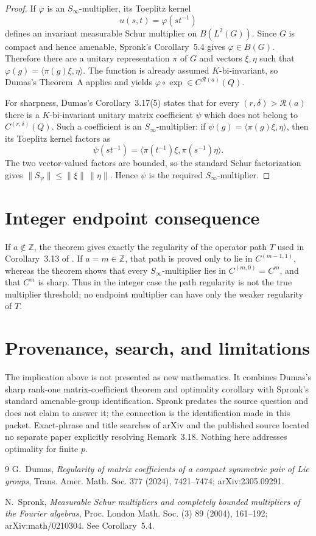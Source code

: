 \documentclass[11pt]{article}
\newcommand{\Z}{\mathbb Z}
\begin{document}
\begin{proof}
If $\varphi$ is an $S_\infty$-multiplier, its Toeplitz kernel
\[
 u(s,t)=\varphi(st^{-1})
\]
defines an invariant measurable Schur multiplier on $B(L^2(G))$.  Since $G$
is compact and hence amenable, Spronk's Corollary~5.4 gives
$\varphi\in B(G)$.  Therefore there are a unitary representation $\pi$ of
$G$ and vectors $\xi,\eta$ such that
$\varphi(g)=\langle\pi(g)\xi,\eta\rangle$.  The function is already assumed
$K$-bi-invariant, so Dumas's Theorem~A applies and yields
$\varphi\circ\exp\in C^{\mathcal R(a)}(Q)$.

For sharpness, Dumas's Corollary~3.17(5) states that for every
$(r,\delta)>\mathcal R(a)$ there is a $K$-bi-invariant unitary matrix
coefficient $\psi$ which does not belong to $C^{(r,\delta)}(Q)$.  Such a
coefficient is an $S_\infty$-multiplier: if
$\psi(g)=\langle\pi(g)\xi,\eta\rangle$, then its Toeplitz kernel factors as
\[
 \psi(st^{-1})
 =\big\langle\pi(t^{-1})\xi,\pi(s^{-1})\eta\big\rangle.
\]
The two vector-valued factors are bounded, so the standard Schur
factorization gives
$\|S_\psi\|\leq\|\xi\|\,\|\eta\|$.  Hence $\psi$ is the required
$S_\infty$-multiplier.
\end{proof}

\section*{Integer endpoint consequence}
If $a\notin\Z$, the theorem gives exactly the regularity of the operator path
$T$ used in Corollary~3.13 of \cite{Dumas}.  If $a=m\in\Z$, that path is
proved only to lie in $C^{(m-1,1)}$, whereas the theorem shows that every
$S_\infty$-multiplier lies in $C^{(m,0)}=C^m$, and that $C^m$ is sharp.
Thus in the integer case the path regularity is not the true multiplier
threshold; no endpoint multiplier can have only the weaker regularity of
$T$.

\section*{Provenance, search, and limitations}
The implication above is not presented as new mathematics.  It combines
Dumas's sharp rank-one matrix-coefficient theorem and optimality corollary
with Spronk's standard amenable-group identification.  Spronk predates the
source question and does not claim to answer it; the connection is the
identification made in this packet.  Exact-phrase and title searches of arXiv
and the published source located no separate paper explicitly resolving
Remark~3.18.  Nothing here addresses optimality for finite $p$.

\begin{thebibliography}{9}
G.~Dumas,
\emph{Regularity of matrix coefficients of a compact symmetric pair of Lie
groups}, Trans. Amer. Math. Soc. 377 (2024), 7421--7474;
arXiv:2305.09291.

N.~Spronk,
\emph{Measurable Schur multipliers and completely bounded multipliers of the
Fourier algebras}, Proc. London Math. Soc. (3) 89 (2004), 161--192;
arXiv:math/0210304.  See Corollary~5.4.
\end{thebibliography}
\end{document}
